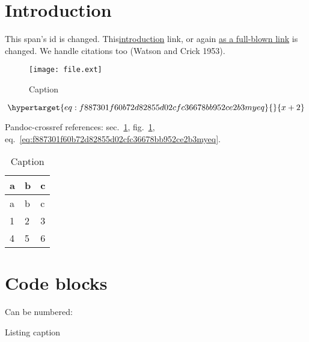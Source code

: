 \hypertarget{sec:f887301f60b72d82855d02cfc36678bb952ce2b3intro}{%
\section{Introduction}\label{sec:f887301f60b72d82855d02cfc36678bb952ce2b3intro}}

\protect\hypertarget{ref}{}{This span's id} is changed.
This\protect\hyperlink{sec:f887301f60b72d82855d02cfc36678bb952ce2b3intro}{introduction}
link, or again \protect\hyperlink{introduction}{as a full-blown link} is
changed. We handle citations too (Watson and Crick 1953).

\begin{figure}
\hypertarget{fig:f887301f60b72d82855d02cfc36678bb952ce2b3image}{%
\centering
\texttt{[image: file.ext]}
\caption{Caption}\label{fig:f887301f60b72d82855d02cfc36678bb952ce2b3image}
}
\end{figure}

\begin{equation}\protect\hypertarget{eq:f887301f60b72d82855d02cfc36678bb952ce2b3myeq}{}{x + 2}\label{eq:f887301f60b72d82855d02cfc36678bb952ce2b3myeq}\end{equation}

Pandoc-crossref references:
sec.~\ref{sec:f887301f60b72d82855d02cfc36678bb952ce2b3intro},
fig.~\ref{fig:f887301f60b72d82855d02cfc36678bb952ce2b3image},
eq.~\ref{eq:f887301f60b72d82855d02cfc36678bb952ce2b3myeq}.

\hypertarget{tbl:f887301f60b72d82855d02cfc36678bb952ce2b3label}{}
\begin{longtable}[]{@{}lll@{}}
\caption{\label{tbl:f887301f60b72d82855d02cfc36678bb952ce2b3label}Caption}\tabularnewline
\toprule
a & b & c \\
\midrule
\endfirsthead
\toprule
a & b & c \\
\midrule
\endhead
1 & 2 & 3 \\
4 & 5 & 6 \\
\bottomrule
\end{longtable}

\hypertarget{code-blocks}{%
\section{Code blocks}\label{code-blocks}}

Can be numbered:

\begin{codelisting}

\caption{Listing caption}

\hypertarget{lst:f887301f60b72d82855d02cfc36678bb952ce2b3numberedcode}{%
\label{lst:f887301f60b72d82855d02cfc36678bb952ce2b3numberedcode}}%
\begin{Shaded}
\begin{Highlighting}[]
 \NormalTok{ ()}
\OtherTok{=}  
\end{Highlighting}
\end{Shaded}

\end{codelisting}

